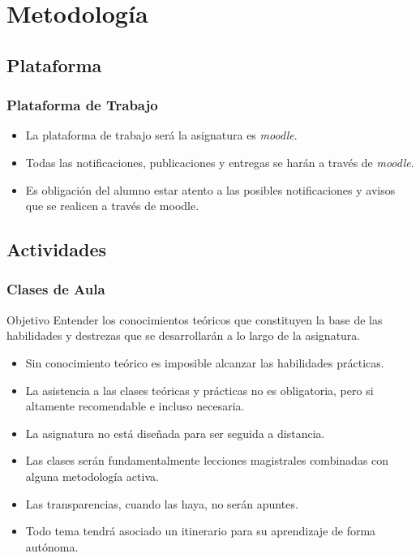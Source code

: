 \documentclass[a4paper,slidestop,xcolor=pst,blue]{beamer}
\begin{document}
\section{Metodología}

\subsection{Plataforma}

\begin{frame}[c]
	\frametitle{Plataforma de Trabajo}
	\begin{itemize}
		\item<1-> La plataforma de trabajo será la asignatura es \emph{moodle}.
		\item<2-> Todas las notificaciones, publicaciones y entregas se harán a través de \emph{moodle}.
		\item<3-> \alert{Es obligación del alumno estar atento a las posibles notificaciones y avisos que se realicen a través de moodle}.
	\end{itemize}
\end{frame}

\subsection{Actividades}

\begin{frame}
	\frametitle{Clases de Aula}
	\begin{block}{Objetivo}
        Entender los conocimientos teóricos que constituyen la base de las habilidades y destrezas que se desarrollarán a lo largo de la asignatura.
	\end{block}
	\begin{itemize}
        \item<2-> Sin conocimiento teórico es imposible alcanzar las habilidades prácticas.
        \item<3-> La asistencia a las clases teóricas y prácticas no es obligatoria, \alert{pero si altamente recomendable e incluso necesaria}.
        \item<4-> La asignatura no está diseñada para ser seguida a distancia.
        \item<5-> Las clases serán fundamentalmente lecciones magistrales combinadas con alguna metodología activa.
        \item<6-> \alert{Las transparencias}, cuando las haya, \alert{no serán apuntes}.
        \item<7-> Todo tema tendrá asociado un itinerario para su aprendizaje de forma autónoma.
	\end{itemize}
\end{frame}
\end{document}
